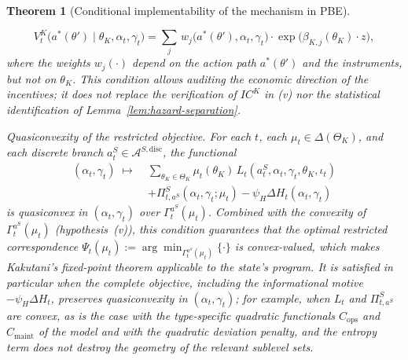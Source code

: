 \documentclass[review,authoryear,12pt]{elsarticle}
\theoremstyle{plain}
\newtheorem{theorem}{Theorem}
\theoremstyle{definition}
\newcommand{\ThetaK}{\Theta_K}
\newcommand{\1}{\mathbf{1}}
\begin{document}
\begin{theorem}[Conditional implementability of the mechanism in PBE]
\begin{list}{}
  \[
    V^K_t\!\bigl(a^\ast(\theta')\mid\theta_K,\alpha_t,\gamma_t\bigr)
    =
    \sum_{j}\,w_j\!\bigl(a^\ast(\theta'),\alpha_t,\gamma_t\bigr)
    \cdot\exp\!\bigl(\beta_{K,j}(\theta_K)\cdot z\bigr),
  \]
  where the weights $w_j(\cdot)$ depend on the action path $a^\ast(\theta')$ and the instruments, but not on $\theta_K$. This condition allows auditing the economic direction of the incentives; it does not replace the verification of $IC^K$ in \textup{(v)} nor the statistical identification of Lemma~\ref{lem:hazard-separation}.
  \item[\textup{(vii)}] Quasiconvexity of the restricted objective. For each $t$, each $\mu_t\in\Delta(\ThetaK)$, and each discrete branch $a_t^S\in\mathcal{A}^{S,\mathrm{disc}}$, the functional
  \[
  \begin{split}
  (\alpha_t,\gamma_t)\;\mapsto\;&\sum_{\theta_K\in\ThetaK}\mu_t(\theta_K)\,L_t(a_t^S,\alpha_t,\gamma_t,\theta_K,\iota_t) \\
  &+\Pi_{t,a^S}^S(\alpha_t,\gamma_t;\mu_t)
  -\psi_H\Delta H_t(\alpha_t,\gamma_t)
  \end{split}
  \]
  is quasiconvex in $(\alpha_t,\gamma_t)$ over $\Gamma_t^{a^S}(\mu_t)$. Combined with the convexity of $\Gamma_t^{a^S}(\mu_t)$ \textup{(}hypothesis~\textup{(v)}\textup{)}, this condition guarantees that the optimal restricted correspondence $\Psi_t(\mu_t):=\arg\min_{\Gamma_t^{a^S}(\mu_t)}\{\cdot\}$ is convex-valued, which makes Kakutani's fixed-point theorem applicable to the state's program. It is satisfied in particular when the complete objective, including the informational motive $-\psi_H\Delta H_t$, preserves quasiconvexity in $(\alpha_t,\gamma_t)$; for example, when $L_t$ and $\Pi_{t,a^S}^S$ are convex, as is the case with the type-specific quadratic functionals $C_{\mathrm{ops}}$ and $C_{\mathrm{maint}}$ of the model and with the quadratic deviation penalty, and the entropy term does not destroy the geometry of the relevant sublevel sets.
\end{list}


\end{theorem}
\end{document}
